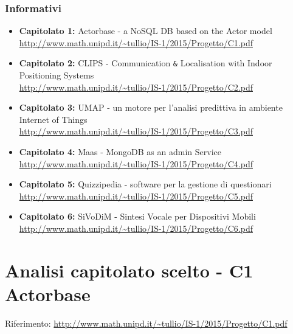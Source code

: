 \documentclass{scalatekids-article}
\begin{document}
\subsubsection{Informativi}
\begin{itemize}
\item \textbf{Capitolato 1:} Actorbase - a NoSQL DB based on the Actor model\\
  \url{http://www.math.unipd.it/~tullio/IS-1/2015/Progetto/C1.pdf}
\item \textbf{Capitolato 2:} CLIPS - Communication \verb=&= Localisation with Indoor Positioning Systems\\
  \url{http://www.math.unipd.it/~tullio/IS-1/2015/Progetto/C2.pdf}
\item \textbf{Capitolato 3:} UMAP - un motore per l'analisi predittiva in ambiente Internet of Things \\
  \url{http://www.math.unipd.it/~tullio/IS-1/2015/Progetto/C3.pdf}
\item \textbf{Capitolato 4:} Maas - MongoDB as an admin Service \\
  \url{http://www.math.unipd.it/~tullio/IS-1/2015/Progetto/C4.pdf}
\item \textbf{Capitolato 5:} Quizzipedia - software per la gestione di questionari \\
  \url{http://www.math.unipd.it/~tullio/IS-1/2015/Progetto/C5.pdf}
\item \textbf{Capitolato 6:} SiVoDiM - Sintesi Vocale per Dispositivi Mobili \\
  \url{http://www.math.unipd.it/~tullio/IS-1/2015/Progetto/C6.pdf}
\end{itemize}

\section{Analisi capitolato scelto - C1 Actorbase}
Riferimento: \url{http://www.math.unipd.it/~tullio/IS-1/2015/Progetto/C1.pdf}\\
\end{document}
